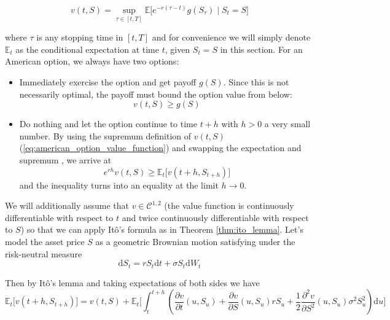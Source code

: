 \begin{equation}
    v(t, S) = \sup_{\tau \in [t, T]} \mathbb E\big[e^{-r(\tau - t)}g(S_\tau) \mid S_t = S\big]
\label{eq:american_option_value_function}
\end{equation}

where $\tau$ is any stopping time in $[t, T]$ and for convenience we will simply denote $\mathbb E_t$ as the conditional expectation at time $t$, given $S_t = S$ in this section. For an American option, we always have two options:

\begin{itemize}
    \item Immediately exercise the option and get payoff $g(S)$. Since this is not necessarily optimal, the payoff must bound the option value from below:
    \begin{equation}
        v(t, S) \ge g(S)
    \end{equation}
    \item Do nothing and let the option continue to time $t + h$ with $h>0$ a very small number. By using the supremum definition of $v(t, S)$ (\ref{eq:american_option_value_function}) and swapping the expectation and supremum \cite{zheng2025fundamentals}, we arrive at
    \begin{equation}
        e^{rh}v(t, S) \ge \mathbb E_t \big[v(t+h, S_{t + h})\big]
    \label{eq:continuation_value_inequality}
    \end{equation}
    and the inequality turns into an equality at the limit $h \to 0$.
    
\end{itemize}

We will additionally assume that $v \in \mathcal C^{1,2}$ (the value function is continuously differentiable with respect to $t$ and twice continuously differentiable with respect to $S$) so that we can apply Itô's formula as in Theorem \ref{thm:ito_lemma}. Let's model the asset price $S$ as a geometric Brownian motion satisfying under the risk-neutral measure
\begin{equation}
    \mathrm dS_t = rS_t \mathrm dt + \sigma S_t \mathrm dW_t
\end{equation}

Then by Itô’s lemma and taking expectations of both sides we have
\begin{equation}
    \mathbb E_t \big[v(t + h, S_{t+h})\big] = v(t, S) + \mathbb E_t \bigg[\int_t^{t+h} \left(\frac{\partial v}{\partial t}(u, S_u) + \frac{\partial v}{\partial S}(u, S_u) r S_u + \frac{1}{2}\frac{\partial ^2v}{\partial S^2}(u, S_u) \sigma^2 S_u^2\right)\mathrm du\bigg]
\label{eq:ito_expansion}
\end{equation}

